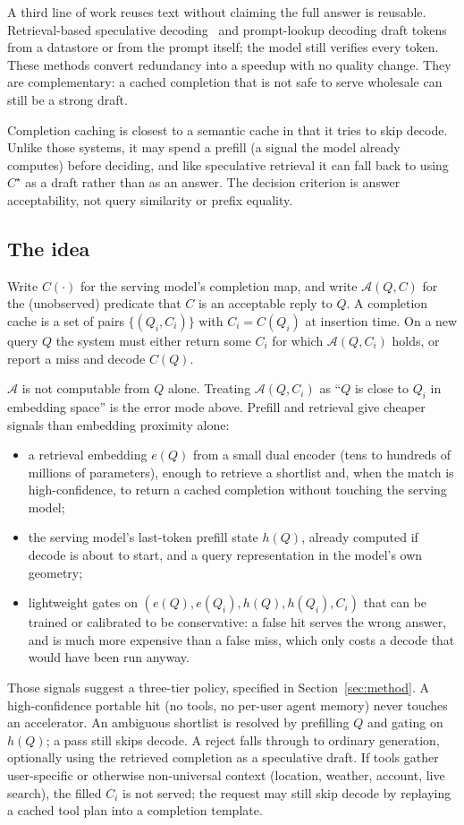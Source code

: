 A third line of work reuses text without claiming the full answer is reusable. Retrieval-based speculative decoding~\citep{he2024rest} and prompt-lookup decoding draft tokens from a datastore or from the prompt itself; the model still verifies every token. These methods convert redundancy into a speedup with no quality change. They are complementary: a cached completion that is not safe to serve wholesale can still be a strong draft.

Completion caching is closest to a semantic cache in that it tries to skip decode. Unlike those systems, it may spend a prefill (a signal the model already computes) before deciding, and like speculative retrieval it can fall back to using $C^\star$ as a draft rather than as an answer. The decision criterion is answer acceptability, not query similarity or prefix equality.

\subsection{The idea}
\label{sec:intro-idea}

Write $C(\cdot)$ for the serving model's completion map, and write $\mathcal{A}(Q, C)$ for the (unobserved) predicate that $C$ is an acceptable reply to $Q$. A completion cache is a set of pairs $\{(Q_i, C_i)\}$ with $C_i = C(Q_i)$ at insertion time. On a new query $Q$ the system must either return some $C_i$ for which $\mathcal{A}(Q, C_i)$ holds, or report a miss and decode $C(Q)$.

$\mathcal{A}$ is not computable from $Q$ alone. Treating $\mathcal{A}(Q, C_i)$ as ``$Q$ is close to $Q_i$ in embedding space'' is the error mode above. Prefill and retrieval give cheaper signals than embedding proximity alone:
\begin{itemize}
  \item a retrieval embedding $e(Q)$ from a small dual encoder (tens to hundreds of millions of parameters), enough to retrieve a shortlist and, when the match is high-confidence, to return a cached completion without touching the serving model;
  \item the serving model's last-token prefill state $h(Q)$, already computed if decode is about to start, and a query representation in the model's own geometry;
  \item lightweight gates on $(e(Q), e(Q_i), h(Q), h(Q_i), C_i)$ that can be trained or calibrated to be conservative: a false hit serves the wrong answer, and is much more expensive than a false miss, which only costs a decode that would have been run anyway.
\end{itemize}
Those signals suggest a three-tier policy, specified in Section~\ref{sec:method}. A high-confidence portable hit (no tools, no per-user agent memory) never touches an accelerator. An ambiguous shortlist is resolved by prefilling $Q$ and gating on $h(Q)$; a pass still skips decode. A reject falls through to ordinary generation, optionally using the retrieved completion as a speculative draft. If tools gather user-specific or otherwise non-universal context (location, weather, account, live search), the filled $C_i$ is not served; the request may still skip decode by replaying a cached tool plan into a completion template.

